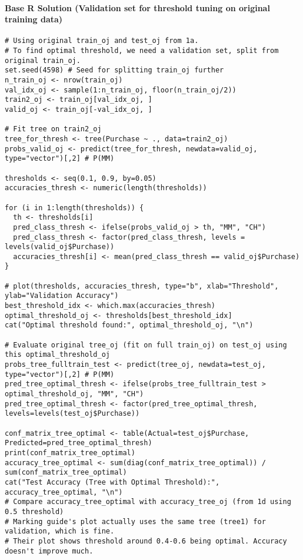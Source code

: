 \documentclass[12pt,a4paper]{article}
\begin{document}
        \paragraph{Base R Solution (Validation set for threshold tuning on original training data)}
\begin{lstlisting}
# Using original train_oj and test_oj from 1a.
# To find optimal threshold, we need a validation set, split from original train_oj.
set.seed(4598) # Seed for splitting train_oj further
n_train_oj <- nrow(train_oj)
val_idx_oj <- sample(1:n_train_oj, floor(n_train_oj/2))
train2_oj <- train_oj[val_idx_oj, ]
valid_oj <- train_oj[-val_idx_oj, ]

# Fit tree on train2_oj
tree_for_thresh <- tree(Purchase ~ ., data=train2_oj)
probs_valid_oj <- predict(tree_for_thresh, newdata=valid_oj, type="vector")[,2] # P(MM)

thresholds <- seq(0.1, 0.9, by=0.05)
accuracies_thresh <- numeric(length(thresholds))

for (i in 1:length(thresholds)) {
  th <- thresholds[i]
  pred_class_thresh <- ifelse(probs_valid_oj > th, "MM", "CH")
  pred_class_thresh <- factor(pred_class_thresh, levels = levels(valid_oj$Purchase))
  accuracies_thresh[i] <- mean(pred_class_thresh == valid_oj$Purchase)
}

# plot(thresholds, accuracies_thresh, type="b", xlab="Threshold", ylab="Validation Accuracy")
best_threshold_idx <- which.max(accuracies_thresh)
optimal_threshold_oj <- thresholds[best_threshold_idx]
cat("Optimal threshold found:", optimal_threshold_oj, "\n")

# Evaluate original tree_oj (fit on full train_oj) on test_oj using this optimal_threshold_oj
probs_tree_fulltrain_test <- predict(tree_oj, newdata=test_oj, type="vector")[,2] # P(MM)
pred_tree_optimal_thresh <- ifelse(probs_tree_fulltrain_test > optimal_threshold_oj, "MM", "CH")
pred_tree_optimal_thresh <- factor(pred_tree_optimal_thresh, levels=levels(test_oj$Purchase))

conf_matrix_tree_optimal <- table(Actual=test_oj$Purchase, Predicted=pred_tree_optimal_thresh)
print(conf_matrix_tree_optimal)
accuracy_tree_optimal <- sum(diag(conf_matrix_tree_optimal)) / sum(conf_matrix_tree_optimal)
cat("Test Accuracy (Tree with Optimal Threshold):", accuracy_tree_optimal, "\n")
# Compare accuracy_tree_optimal with accuracy_tree_oj (from 1d using 0.5 threshold)
# Marking guide's plot actually uses the same tree (tree1) for validation, which is fine.
# Their plot shows threshold around 0.4-0.6 being optimal. Accuracy doesn't improve much.
\end{lstlisting}
\end{document}
